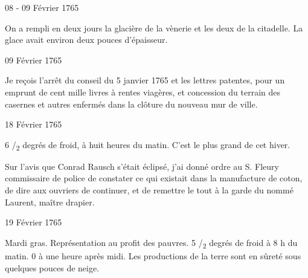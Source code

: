                      \begin{diary}{08 - 09 Février 1765}{}
                        
                         On a rempli en deux jours la
                           glacière de la
                              vènerie
                           et les deux de la
                              citadelle.
                           La glace
                           avait environ deux pouces d'épaisseur.
                        \bigskip
        
        
                     \end{diary}
                     
                     \begin{diary}{09 Février 1765}{}
                        
                         Je reçois l'arrêt du conseil du 5
                              janvier
                              1765 et les lettres patentes, pour un emprunt
                           de cent mille
                              livres à rentes viagères, et concession
                           du terrain des casernes et autres enfermés
                           dans la clôture du nouveau mur de ville. \bigskip
        
        
                     \end{diary}

                     \begin{diary}{18 Février 1765}{}
                        
                        
                           6 /\textsubscript{2}
                              degrés de froid, à huit heures du matin.
                           C'est le plus grand de cet hiver. \bigskip
        
        
                         Sur l'avis que Conrad Rausch s'était éclipsé,
                           j'ai donné ordre au S.
                              Fleury commissaire de
                           police de constater ce qui existait dans la
                              manufacture de coton, de dire aux ouvriers
                           de continuer, et de remettre le tout à la garde
                           du nommé Laurent, maître drapier. \bigskip
        
        
                     \end{diary}

                     \begin{diary}{19 Février 1765}{}
                        
                         Mardi gras.
                           Représentation au profit
                           des pauvres. 5 /\textsubscript{2}
                              degrés de froid à 8 h
                              du matin. 0 à une heure après midi.
                           Les productions de la terre sont en sûreté
                           sous quelques pouces de neige. \bigskip
        
        
                     \end{diary}

